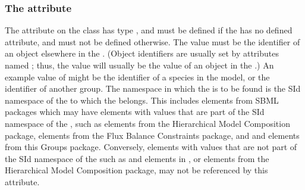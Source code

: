 \subsubsection{The \fixttspace{} attribute}
\label{member-idref-attribute}

The attribute  on the \Member class has type , and must be defined if the \Member has no defined  attribute, and must not be defined otherwise.  The value must be the identifier of an object elsewhere in the \Model.  (Object identifiers are usually set by attributes named ; thus, the  value will usually be the  value of an object in the \Model.)  An example value of  might be the identifier of a species in the model, or the identifier of another group.  The namespace in which the  is to be found is the SId namespace of the \Model to which the \Group belongs.  This includes elements from SBML packages which may have elements with  values that are part of the SId namespace of the \Model, such as \Deletion elements from the Hierarchical Model Composition package, \FluxBound elements from the Flux Balance Constraints package, and \Group and \Member elements from this Groups package.  Conversely, elements with  values that are not part of the SId namespace of the \Model such as \Unit and \LocalParameter elements in \sbmlthreecore, or \Port elements from the Hierarchical Model Composition package, may not be referenced by this  attribute.



